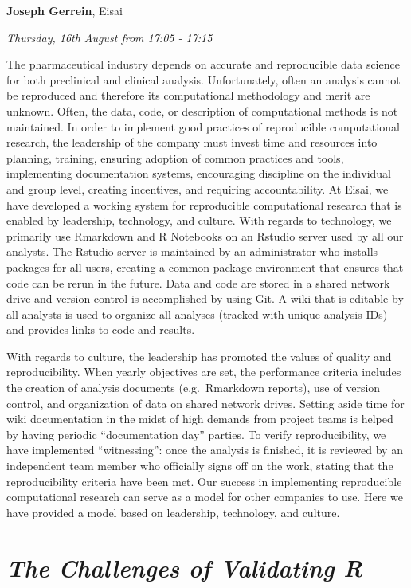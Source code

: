 \documentclass[]{book}
\theoremstyle{definition}
\theoremstyle{definition}
\theoremstyle{definition}
\theoremstyle{remark}
\begin{document}
\textbf{Joseph Gerrein}, Eisai

\emph{Thursday, 16th August from 17:05 - 17:15}

The pharmaceutical industry depends on accurate and reproducible data
science for both preclinical and clinical analysis. Unfortunately, often
an analysis cannot be reproduced and therefore its computational
methodology and merit are unknown. Often, the data, code, or description
of computational methods is not maintained. In order to implement good
practices of reproducible computational research, the leadership of the
company must invest time and resources into planning, training, ensuring
adoption of common practices and tools, implementing documentation
systems, encouraging discipline on the individual and group level,
creating incentives, and requiring accountability. At Eisai, we have
developed a working system for reproducible computational research that
is enabled by leadership, technology, and culture. With regards to
technology, we primarily use Rmarkdown and R Notebooks on an Rstudio
server used by all our analysts. The Rstudio server is maintained by an
administrator who installs packages for all users, creating a common
package environment that ensures that code can be rerun in the future.
Data and code are stored in a shared network drive and version control
is accomplished by using Git. A wiki that is editable by all analysts is
used to organize all analyses (tracked with unique analysis IDs) and
provides links to code and results.

With regards to culture, the leadership has promoted the values of
quality and reproducibility. When yearly objectives are set, the
performance criteria includes the creation of analysis documents
(e.g.~Rmarkdown reports), use of version control, and organization of
data on shared network drives. Setting aside time for wiki documentation
in the midst of high demands from project teams is helped by having
periodic ``documentation day'' parties. To verify reproducibility, we
have implemented ``witnessing'': once the analysis is finished, it is
reviewed by an independent team member who officially signs off on the
work, stating that the reproducibility criteria have been met. Our
success in implementing reproducible computational research can serve as
a model for other companies to use. Here we have provided a model based
on leadership, technology, and culture.

\hypertarget{the-challenges-of-validating-r-1}{%
\section{\texorpdfstring{\emph{The Challenges of Validating
R}}{The Challenges of Validating R}}\label{the-challenges-of-validating-r-1}}
\end{document}
